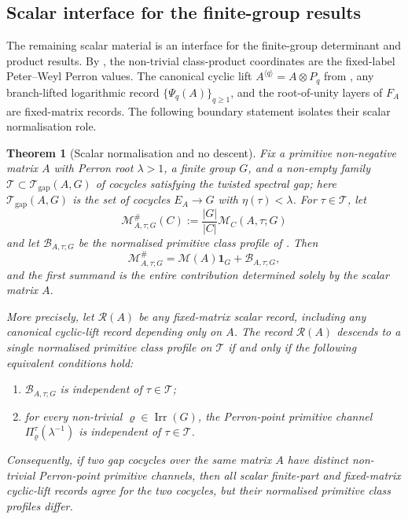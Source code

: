 \documentclass[11pt,a4paper]{amsart}
\theoremstyle{plain}
\newtheorem{theorem}{Theorem}[section]
\theoremstyle{definition}
\theoremstyle{remark}
\DeclareMathOperator{\Irr}{Irr}
\begin{document}
\subsection{Scalar interface for the finite-group results}

The remaining scalar material is an interface for the finite-group determinant
and product results.  By , the
non-trivial class-product coordinates are the fixed-label Peter--Weyl Perron
values. The canonical cyclic lift
\(A^{\langle q\rangle}=A\otimes P_q\) from , any
branch-lifted logarithmic record \(\{\Psi_q(A)\}_{q\ge1}\), and the
root-of-unity layers of \(F_A\) are fixed-matrix records. The following
boundary statement isolates their scalar normalisation role.

\begin{theorem}[Scalar normalisation and no descent]
  \label{thm:finite-part-scalar-interface-no-descent}
  Fix a primitive non-negative matrix \(A\) with Perron root
  \(\lambda>1\), a finite group \(G\), and a non-empty family
  \(\mathscr T\subset\mathcal T_{\mathrm{gap}}(A,G)\) of cocycles
  satisfying the twisted spectral gap; here
  \(\mathcal T_{\mathrm{gap}}(A,G)\) is the set of cocycles
  \(E_A\to G\) with \(\eta(\tau)<\lambda\). For
  \(\tau\in\mathscr T\), let
  \[
    \mathcal M^\#_{A,\tau;G}(C):=\frac{|G|}{|C|}\mathcal M_C(A,\tau;G)
  \]
  and let \(\mathcal B_{A,\tau;G}\) be the normalised primitive class
  profile of . Then
  \begin{equation}\label{eq:finite-part-scalar-interface-splitting}
    \mathcal M^\#_{A,\tau;G}
    =
    \mathcal M(A)\mathbf 1_G+
    \mathcal B_{A,\tau;G},
  \end{equation}
  and the first summand is the entire contribution determined solely by
  the scalar matrix \(A\).

  More precisely, let \(\mathcal R(A)\) be any fixed-matrix scalar record,
  including any canonical cyclic-lift record depending only on \(A\).
  The record \(\mathcal R(A)\)
  descends to a single normalised primitive class profile on
  \(\mathscr T\) if and only if the following equivalent conditions hold:
  \begin{enumerate}[label=\textup{(\roman*)}]
    \item \(\mathcal B_{A,\tau;G}\) is independent of
      \(\tau\in\mathscr T\);
    \item for every non-trivial \(\varrho\in\Irr(G)\), the Perron-point
      primitive channel \(\Pi_\varrho^\tau(\lambda^{-1})\) is independent
      of \(\tau\in\mathscr T\).
  \end{enumerate}
  Consequently, if two gap cocycles over the same matrix \(A\) have
  distinct non-trivial Perron-point primitive channels, then all scalar
  finite-part and fixed-matrix cyclic-lift records agree for the two
  cocycles, but their normalised primitive class profiles differ.
\end{theorem}
\end{document}
